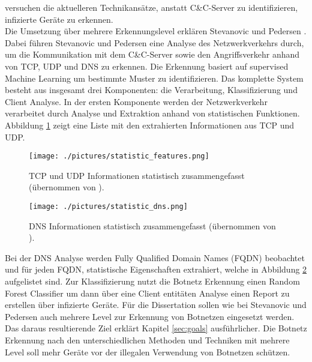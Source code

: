 versuchen die aktuelleren Technikansätze, anstatt C\&C-Server zu identifizieren, infizierte Geräte zu erkennen. \\ Die Umsetzung über mehrere Erkennungslevel erklären Stevanovic und Pedersen 
\cite{DBLP:journals/ijcysa/StevanovicP16}. Dabei führen Stevanovic und Pedersen eine Analyse des Netzwerkverkehrs durch, um die Kommunikation mit dem C\&C-Server sowie den Angriffsverkehr anhand von
TCP, UDP und DNS zu erkennen. Die Erkennung basiert auf supervised Machine Learning um bestimmte Muster zu identifizieren. Das komplette System besteht aus insgesamt drei Komponenten: die Verarbeitung,
Klassifizierung und Client Analyse. In der ersten Komponente werden der Netzwerkverkehr verarbeitet durch Analyse und Extraktion anhand von statistischen Funktionen. Abbildung \ref{fig:stats_features} 
zeigt eine Liste mit den extrahierten Informationen aus TCP und UDP. 

\begin{figure}[h!]
    \centering
    \texttt{[image: ./pictures/statistic\_features.png]}
    \caption{TCP und UDP Informationen statistisch zusammengefasst (übernommen von \cite{DBLP:journals/ijcysa/StevanovicP16}).}
    \label{fig:stats_features}
\end{figure}

\begin{figure}[h!]
    \centering
    \texttt{[image: ./pictures/statistic\_dns.png]}
    \caption{DNS Informationen statistisch zusammengefasst (übernommen von \cite{DBLP:journals/ijcysa/StevanovicP16}).}
    \label{fig:stats_dns}
\end{figure}

Bei der DNS Analyse werden Fully Qualified Domain Names (FQDN) beobachtet und für jeden FQDN, statistische Eigenschaften extrahiert, welche in Abbildung \ref{fig:stats_dns} aufgelistet sind. Zur 
Klassifizierung nutzt die Botnetz Erkennung einen Random Forest Classifier um dann über eine Client entitäten Analyse einen Report zu erstellen über infizierte Geräte. Für die Dissertation sollen 
wie bei Stevanovic und Pedersen auch mehrere Level zur Erkennung von Botnetzen eingesetzt werden. Das daraus resultierende Ziel erklärt Kapitel \ref{sec:goals} ausführlicher.
Die Botnetz Erkennung nach den unterschiedlichen Methoden und Techniken mit mehrere Level soll mehr Geräte vor der illegalen Verwendung von Botnetzen schützen. 

